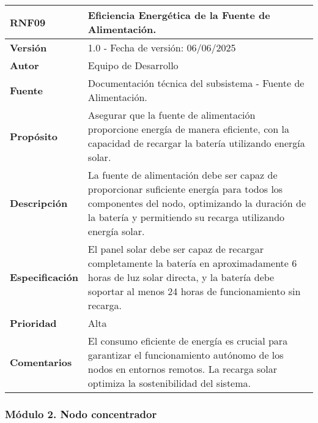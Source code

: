 \begin{longtable}{|l|p{12cm}|}
\hline
\textbf{RNF09} & \textbf{Eficiencia Energética de la Fuente de Alimentación.} \\
\hline
\endfirsthead
\hline
\textbf{Versión} & 1.0 - Fecha de versión: 06/06/2025 \\
\hline
\textbf{Autor} & Equipo de Desarrollo \\
\hline
\textbf{Fuente} & Documentación técnica del subsistema - Fuente de Alimentación. \\
\hline
\textbf{Propósito} & Asegurar que la fuente de alimentación proporcione energía de manera eficiente, con la capacidad de recargar la batería utilizando energía solar. \\
\hline
\textbf{Descripción} & La fuente de alimentación debe ser capaz de proporcionar suficiente energía para todos los componentes del nodo, optimizando la duración de la batería y permitiendo su recarga utilizando energía solar. \\
\hline
\textbf{Especificación} & El panel solar debe ser capaz de recargar completamente la batería en aproximadamente 6 horas de luz solar directa, y la batería debe soportar al menos 24 horas de funcionamiento sin recarga. \\
\hline
\textbf{Prioridad} & Alta \\
\hline
\textbf{Comentarios} & El consumo eficiente de energía es crucial para garantizar el funcionamiento autónomo de los nodos en entornos remotos. La recarga solar optimiza la sostenibilidad del sistema. \\
\hline
\end{longtable}

\subsubsection*{Módulo 2. Nodo concentrador}


